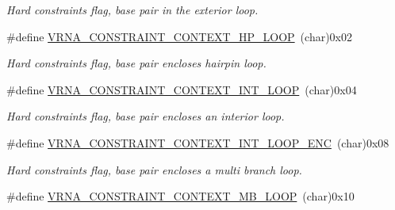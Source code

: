 \begin{DoxyCompactItemize}
\begin{DoxyCompactList}\small\item\em Hard constraints flag, base pair in the exterior loop. \end{DoxyCompactList}\item 
\#define \hyperlink{group__hard__constraints_ga79203702b197b6b9d3b78eed40663eb1}{V\+R\+N\+A\+\_\+\+C\+O\+N\+S\+T\+R\+A\+I\+N\+T\+\_\+\+C\+O\+N\+T\+E\+X\+T\+\_\+\+H\+P\+\_\+\+L\+O\+OP}~(char)0x02\hypertarget{group__hard__constraints_ga79203702b197b6b9d3b78eed40663eb1}{}\label{group__hard__constraints_ga79203702b197b6b9d3b78eed40663eb1}

\begin{DoxyCompactList}\small\item\em Hard constraints flag, base pair encloses hairpin loop. \end{DoxyCompactList}\item 
\#define \hyperlink{group__hard__constraints_ga21feeab3a9e5fa5a9e3d9ac0fcf5994f}{V\+R\+N\+A\+\_\+\+C\+O\+N\+S\+T\+R\+A\+I\+N\+T\+\_\+\+C\+O\+N\+T\+E\+X\+T\+\_\+\+I\+N\+T\+\_\+\+L\+O\+OP}~(char)0x04\hypertarget{group__hard__constraints_ga21feeab3a9e5fa5a9e3d9ac0fcf5994f}{}\label{group__hard__constraints_ga21feeab3a9e5fa5a9e3d9ac0fcf5994f}

\begin{DoxyCompactList}\small\item\em Hard constraints flag, base pair encloses an interior loop. \end{DoxyCompactList}\item 
\#define \hyperlink{group__hard__constraints_ga0536288e04ff6332ecdc23ca4705402b}{V\+R\+N\+A\+\_\+\+C\+O\+N\+S\+T\+R\+A\+I\+N\+T\+\_\+\+C\+O\+N\+T\+E\+X\+T\+\_\+\+I\+N\+T\+\_\+\+L\+O\+O\+P\+\_\+\+E\+NC}~(char)0x08\hypertarget{group__hard__constraints_ga0536288e04ff6332ecdc23ca4705402b}{}\label{group__hard__constraints_ga0536288e04ff6332ecdc23ca4705402b}

\begin{DoxyCompactList}\small\item\em Hard constraints flag, base pair encloses a multi branch loop. \end{DoxyCompactList}\item 
\#define \hyperlink{group__hard__constraints_ga456ecd2ff00056bb64da8dd4f61bbfc5}{V\+R\+N\+A\+\_\+\+C\+O\+N\+S\+T\+R\+A\+I\+N\+T\+\_\+\+C\+O\+N\+T\+E\+X\+T\+\_\+\+M\+B\+\_\+\+L\+O\+OP}~(char)0x10\hypertarget{group__hard__constraints_ga456ecd2ff00056bb64da8dd4f61bbfc5}{}\label{group__hard__constraints_ga456ecd2ff00056bb64da8dd4f61bbfc5}


\end{DoxyCompactItemize}
